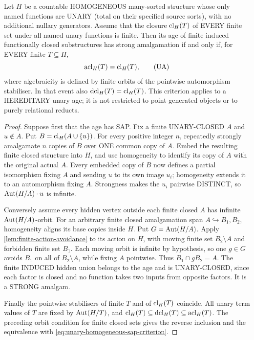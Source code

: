 \begin{lemma}
\label{lem:unary-homogeneous-sap-criterion}
Let $H$ be a countable HOMOGENEOUS many-sorted
structure whose only named functions are UNARY
(total on their specified source sorts), with no
additional nullary generators.  Assume that
the closure $\operatorname{cl}_H(T)$ of EVERY finite set
under all named unary functions is finite.
Then its age of finite induced functionally
closed substructures has strong amalgamation
if and only if, for EVERY finite $T\subseteq H$,
\[
             \operatorname{acl}_H(T)=\operatorname{cl}_H(T),
 \tag{UA}\label{eq:unary-homogeneous-sap-criterion}
\]
where algebraicity is defined by finite
orbits of the pointwise automorphism stabiliser.
In that event also
$\operatorname{dcl}_H(T)=\operatorname{cl}_H(T)$.
This criterion applies to a HEREDITARY unary
age; it is not restricted to point-generated
objects or to purely relational reducts.
\end{lemma}
\begin{proof}
Suppose first that the age has SAP.
Fix a finite UNARY-CLOSED $A$ and $u\notin A$.
Put $B=\operatorname{cl}_H(A\cup\{u\})$.
For every positive integer $n$, repeatedly
strongly amalgamate $n$ copies of $B$
over ONE common copy of $A$. Embed
the resulting finite closed structure
into $H$, and use homogeneity to
identify its copy of $A$ with the
original actual $A$.  Every embedded
copy of $B$ now defines a partial
isomorphism fixing $A$ and sending
$u$ to its own image $u_i$;
homogeneity extends it to an
automorphism fixing $A$.
Strongness makes the $u_i$ pairwise
DISTINCT, so $\operatorname{Aut}(H/A)\cdot u$
is infinite.

Conversely assume every hidden vertex
outside each finite closed $A$
has infinite $\operatorname{Aut}(H/A)$-orbit.
For an arbitrary finite closed
amalgamation span $A\hookrightarrow B_1,B_2$,
homogeneity aligns its base copies
inside $H$. Put $G=\operatorname{Aut}(H/A)$.
Apply \cref{lem:finite-action-avoidance} to its action on $H$,
with moving finite set $B_2\setminus A$ and forbidden finite set
$B_1$. Each moving orbit is infinite by hypothesis, so one $g\in G$
avoids $B_1$ on all of $B_2\setminus A$, while fixing $A$ pointwise.
Thus $B_1\cap gB_2=A$. The finite
INDUCED hidden union belongs to
the age and is UNARY-CLOSED, since
each factor is closed and no function
takes two inputs from opposite factors.
It is a STRONG amalgam.

Finally the pointwise stabilisers
of finite $T$ and of $\operatorname{cl}_H(T)$ coincide.
All unary term values of $T$ are
fixed by $\operatorname{Aut}(H/T)$, and
$\operatorname{cl}_H(T)\subseteq\operatorname{dcl}_H(T)
\subseteq\operatorname{acl}_H(T)$.
The preceding orbit condition for
finite closed sets gives the reverse
inclusion and the equivalence
with \eqref{eq:unary-homogeneous-sap-criterion}.
\end{proof}

